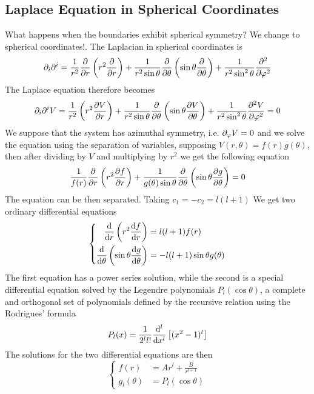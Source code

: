 \documentclass[../electromagnetism]{subfiles}
\begin{document}
\subsection{Laplace Equation in Spherical Coordinates}%
What happens when the boundaries exhibit spherical symmetry? We change to spherical coordinates!. The Laplacian in spherical coordinates is
\begin{equation*}
	\partial_i\partial^i=\frac{1}{r^2}\pdv{r}\left( r^2\pdv{r} \right)+\frac{1}{r^2\sin\theta}\pdv{\theta}\left( \sin\theta\pdv{\theta} \right)+\frac{1}{r^2\sin^2\theta}\pdv[2]{\varphi}
\end{equation*}
The Laplace equation therefore becomes
\begin{equation}
	\partial_i\partial^iV=\frac{1}{r^2}\left( r^2\pdv{V}{r} \right)+\frac{1}{r^2\sin\theta}\pdv{\theta}\left( \sin\theta\pdv{V}{\theta} \right)+\frac{1}{r^2\sin^2\theta}\pdv[2]{V}{\varphi}=0
	\label{eq:laplacesph}
\end{equation}
We suppose that the system has azimuthal symmetry, i.e. $\partial_\varphi V=0$ and we solve the equation using the separation of variables, supposing $V(r,\theta)=f(r)g(\theta)$, then after dividing by $V$ and multiplying by $r^2$ we get the following equation
\begin{equation*}
	\frac{1}{f(r)}\pdv{r}\left( r^2\pdv{f}{r} \right)+\frac{1}{g(\theta)\sin\theta}\pdv{\theta}\left( \sin\theta\pdv{g}{\theta} \right)=0
\end{equation*}
The equation can be then separated. Taking $c_1=-c_2=l(l+1)$ We get two ordinary differential equations
\begin{equation}
	\left\{ \begin{aligned}
			\dv{r}\left( r^2\dv{f}{r} \right)&=l(l+1)f(r)\\
			\dv{\theta}\left( \sin\theta\dv{g}{\theta} \right)&=-l(l+1)\sin\theta g(\theta)
	\end{aligned}\right.
	\label{eq:laplacesepsph}
\end{equation}
The first equation has a power series solution, while the second is a special differential equation solved by the Legendre polynomials $P_l(\cos\theta)$, a complete and orthogonal set of polynomials defined by the recursive relation using the Rodrigues' formula
\begin{equation}
	P_l(x)=\frac{1}{2^ll!}\dv[l]{x}\left[ (x^2-1)^l \right]
	\label{eq:rodriguesleg}
\end{equation}
The solutions for the two differential equations are then
\begin{equation}
	\left\{ \begin{aligned}
			f(r)&=Ar^l+\frac{B}{r^{l+1}}\\
			g_l(\theta)&=P_l(\cos\theta)
	\end{aligned}\right.
	\label{eq:sphsolleg}
\end{equation}
\end{document}
